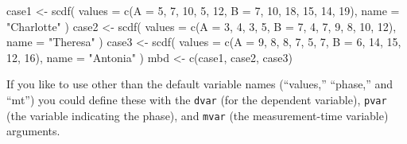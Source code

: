 \documentclass[
]{book}
\newenvironment{Shaded}{\begin{snugshade}}{\end{snugshade}}
\newcommand{\AttributeTok}[1]{\textcolor[rgb]{0.77,0.63,0.00}{#1}}
\newcommand{\DecValTok}[1]{\textcolor[rgb]{0.00,0.00,0.81}{#1}}
\newcommand{\FunctionTok}[1]{\textcolor[rgb]{0.00,0.00,0.00}{#1}}
\newcommand{\NormalTok}[1]{#1}
\newcommand{\OtherTok}[1]{\textcolor[rgb]{0.56,0.35,0.01}{#1}}
\newcommand{\StringTok}[1]{\textcolor[rgb]{0.31,0.60,0.02}{#1}}
\begin{document}
\begin{Shaded}
\begin{Highlighting}[]
\NormalTok{case1 }\OtherTok{\textless{}{-}} \FunctionTok{scdf}\NormalTok{(}
  \AttributeTok{values =} \FunctionTok{c}\NormalTok{(}\AttributeTok{A =} \DecValTok{5}\NormalTok{, }\DecValTok{7}\NormalTok{, }\DecValTok{10}\NormalTok{, }\DecValTok{5}\NormalTok{, }\DecValTok{12}\NormalTok{, }\AttributeTok{B =} \DecValTok{7}\NormalTok{, }\DecValTok{10}\NormalTok{, }\DecValTok{18}\NormalTok{, }\DecValTok{15}\NormalTok{, }\DecValTok{14}\NormalTok{, }\DecValTok{19}\NormalTok{), }
  \AttributeTok{name =} \StringTok{"Charlotte"}
\NormalTok{)}
\NormalTok{case2 }\OtherTok{\textless{}{-}} \FunctionTok{scdf}\NormalTok{(}
  \AttributeTok{values =} \FunctionTok{c}\NormalTok{(}\AttributeTok{A =} \DecValTok{3}\NormalTok{, }\DecValTok{4}\NormalTok{, }\DecValTok{3}\NormalTok{, }\DecValTok{5}\NormalTok{, }\AttributeTok{B =} \DecValTok{7}\NormalTok{, }\DecValTok{4}\NormalTok{, }\DecValTok{7}\NormalTok{, }\DecValTok{9}\NormalTok{, }\DecValTok{8}\NormalTok{, }\DecValTok{10}\NormalTok{, }\DecValTok{12}\NormalTok{), }
  \AttributeTok{name =} \StringTok{"Theresa"}
\NormalTok{)}
\NormalTok{case3 }\OtherTok{\textless{}{-}} \FunctionTok{scdf}\NormalTok{(}
  \AttributeTok{values =} \FunctionTok{c}\NormalTok{(}\AttributeTok{A =} \DecValTok{9}\NormalTok{, }\DecValTok{8}\NormalTok{, }\DecValTok{8}\NormalTok{, }\DecValTok{7}\NormalTok{, }\DecValTok{5}\NormalTok{, }\DecValTok{7}\NormalTok{, }\AttributeTok{B =} \DecValTok{6}\NormalTok{, }\DecValTok{14}\NormalTok{, }\DecValTok{15}\NormalTok{, }\DecValTok{12}\NormalTok{, }\DecValTok{16}\NormalTok{), }
  \AttributeTok{name =} \StringTok{"Antonia"}
\NormalTok{)}
\NormalTok{mbd }\OtherTok{\textless{}{-}} \FunctionTok{c}\NormalTok{(case1, case2, case3)}
\end{Highlighting}
\end{Shaded}

If you like to use other than the default variable names (``values,'' ``phase,'' and ``mt'') you could define these with the \texttt{dvar} (for the dependent variable), \texttt{pvar} (the variable indicating the phase), and \texttt{mvar} (the measurement-time variable) arguments.
\end{document}
